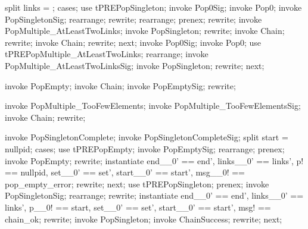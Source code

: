 \begin{forget}[tPREPop0]
split links = \emptyset;
cases;
use tPREPopSingleton;
invoke Pop0Sig;
invoke Pop0;
invoke PopSingletonSig;
rearrange;
rewrite;
rearrange;
prenex;
rewrite;
invoke PopMultiple\_AtLeastTwoLinks;
invoke PopSingleton;
rewrite;
invoke \Delta Chain;
rewrite;
invoke Chain;
rewrite;
next;
invoke Pop0Sig;
invoke Pop0;
use tPREPopMultiple\_AtLeastTwoLinks;
rearrange;
invoke PopMultiple\_AtLeastTwoLinksSig;
invoke PopSingleton;
rewrite;
next;
\end{forget}

\begin{forget}[tPREPopEmpty]
invoke PopEmpty;
invoke \Xi Chain;
invoke PopEmptySig;
rewrite;
\end{forget}

\begin{forget}
invoke PopMultiple\_TooFewElements;
invoke PopMultiple\_TooFewElementsSig;
invoke \Xi Chain;
rewrite;
\end{forget}

\begin{forget}[tPREPopSinglegonComplete]
invoke PopSingletonComplete;
invoke PopSingletonCompleteSig;
split start = nullpid;
cases;
use tPREPopEmpty;
invoke PopEmptySig;
rearrange;
prenex;
invoke PopEmpty;
rewrite;
instantiate end\_\_0' == end', links\_\_0' == links', p! == nullpid, set\_\_0' == set', start\_\_0' == start', msg\_\_0! == pop\_empty\_error;
rewrite;
next;
use tPREPopSingleton;
prenex;
invoke PopSingletonSig;
rearrange;
rewrite;
instantiate end\_\_0' == end', links\_\_0' == links', p\_\_0! == start, set\_\_0' == set', start\_\_0' == start', msg! == chain\_ok;
rewrite;
invoke PopSingleton;
invoke ChainSuccess;
rewrite;
next;
\end{forget}


